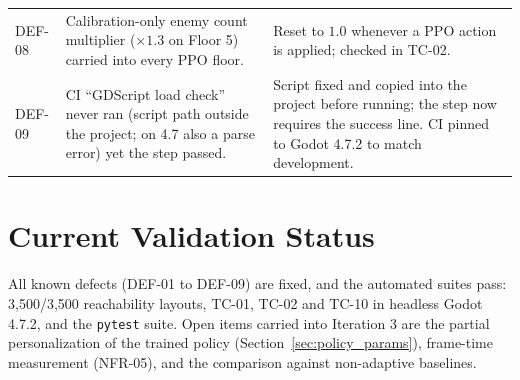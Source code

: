 \begin{table}[!htbp]
\begin{tabular}{p{}p{}p{}}
DEF-08 & Calibration-only enemy count multiplier ($\times1.3$ on Floor 5) carried into every PPO floor. & Reset to $1.0$ whenever a PPO action is applied; checked in TC-02. \\
DEF-09 & CI ``GDScript load check'' never ran (script path outside the project; on 4.7 also a parse error) yet the step passed. & Script fixed and copied into the project before running; the step now requires the success line. CI pinned to Godot 4.7.2 to match development. \\
\bottomrule
\end{tabular}
\end{table}

\section{Current Validation Status}
All known defects (DEF-01 to DEF-09) are fixed, and the automated suites pass: 3,500/3,500 reachability layouts, TC-01, TC-02 and TC-10 in headless Godot 4.7.2, and the \texttt{pytest} suite. Open items carried into Iteration 3 are the partial personalization of the trained policy (Section~\ref{sec:policy_params}), frame-time measurement (NFR-05), and the comparison against non-adaptive baselines.
